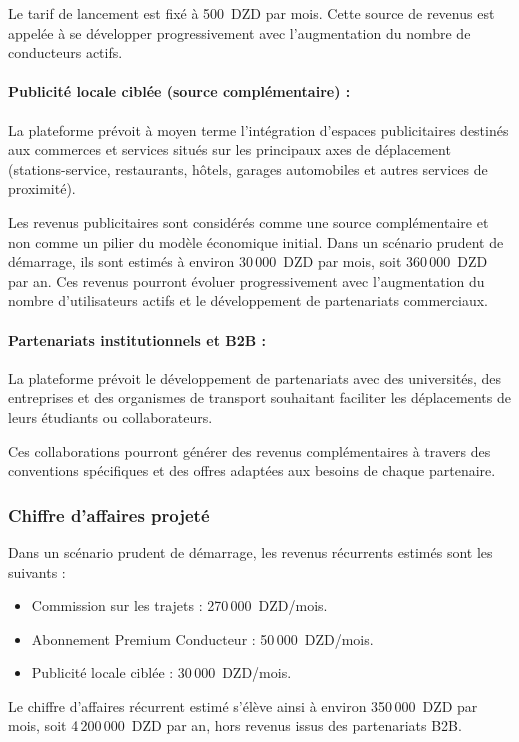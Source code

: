 Le tarif de lancement est fixé à 500~DZD par mois. Cette source de revenus est appelée à se développer progressivement avec l'augmentation du nombre de conducteurs actifs.

\paragraph{Publicité locale ciblée (source complémentaire) :}
La plateforme prévoit à moyen terme l'intégration d'espaces publicitaires destinés aux commerces et services situés sur les principaux axes de déplacement (stations-service, restaurants, hôtels, garages automobiles et autres services de proximité).

Les revenus publicitaires sont considérés comme une source complémentaire et non comme un pilier du modèle économique initial. Dans un scénario prudent de démarrage, ils sont estimés à environ 30\,000~DZD par mois, soit 360\,000~DZD par an. Ces revenus pourront évoluer progressivement avec l'augmentation du nombre d'utilisateurs actifs et le développement de partenariats commerciaux.

\paragraph{Partenariats institutionnels et B2B :}
La plateforme prévoit le développement de partenariats avec des universités, des entreprises et des organismes de transport souhaitant faciliter les déplacements de leurs étudiants ou collaborateurs.

Ces collaborations pourront générer des revenus complémentaires à travers des conventions spécifiques et des offres adaptées aux besoins de chaque partenaire.

\subsubsection{Chiffre d'affaires projeté}

Dans un scénario prudent de démarrage, les revenus récurrents estimés sont les suivants :
\begin{itemize}[leftmargin=1.5em]
    \item Commission sur les trajets : 270\,000~DZD/mois.
    \item Abonnement Premium Conducteur : 50\,000~DZD/mois.
    \item Publicité locale ciblée : 30\,000~DZD/mois.
\end{itemize}

Le chiffre d'affaires récurrent estimé s'élève ainsi à environ 350\,000~DZD par mois, soit 4\,200\,000~DZD par an, hors revenus issus des partenariats B2B.

